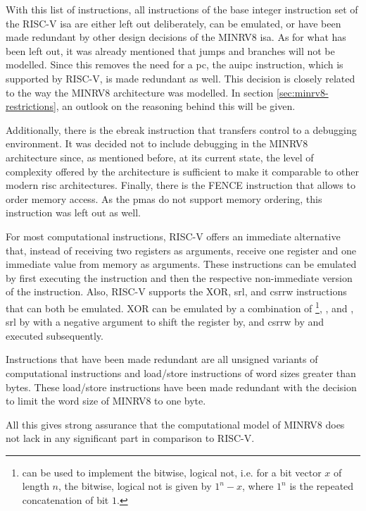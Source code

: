 With this list of instructions, all instructions of the base integer instruction set of the RISC-V \gls{isa} are either left out deliberately, can be emulated, or have been made redundant by other design decisions of the MINRV8 \gls{isa}.
As for what has been left out, it was already mentioned that jumps and branches will not be modelled.
Since this removes the need for a \gls{pc}, the \gls{auipc} instruction, which is supported by RISC-V, is made redundant as well.
This decision is closely related to the way the MINRV8 architecture was modelled.
In section \ref{sec:minrv8-restrictions}, an outlook on the reasoning behind this will be given.

Additionally, there is the \gls{ebreak} instruction that transfers control to a debugging environment.
It was decided not to include debugging in the MINRV8 architecture since, as mentioned before, at its current state, the level of complexity offered by the architecture is sufficient to make it comparable to other modern \gls{risc} architectures.
Finally, there is the FENCE instruction that allows to order memory access.
As the \glspl{pma} do not support memory ordering, this instruction was left out as well.

For most computational instructions, RISC-V offers an immediate alternative that, instead of receiving two registers as arguments, receive one register and one immediate value from memory as arguments.
These instructions can be emulated by first executing the  instruction and then the respective non-immediate version of the instruction.
Also, RISC-V supports the XOR, \gls{srl}, and \gls{csrrw} instructions that can both be emulated.
XOR can be emulated by a combination of \footnote{%
     can be used to implement the bitwise, logical not, i.e. for a bit vector $ x $ of length $ n $, the bitwise, logical not is given by $ 1^n - x $, where $ 1^n $ is the repeated concatenation of bit $ 1 $.
}, , and , \gls{srl} by  with a negative argument to shift the register by, and \gls{csrrw} by  and  executed subsequently.

Instructions that have been made redundant are all unsigned variants of computational instructions and load/store instructions of word sizes greater than bytes.
These load/store instructions have been made redundant with the decision to limit the word size of MINRV8 to one byte.

All this gives strong assurance that the computational model of MINRV8 does not lack in any significant part in comparison to RISC-V.

